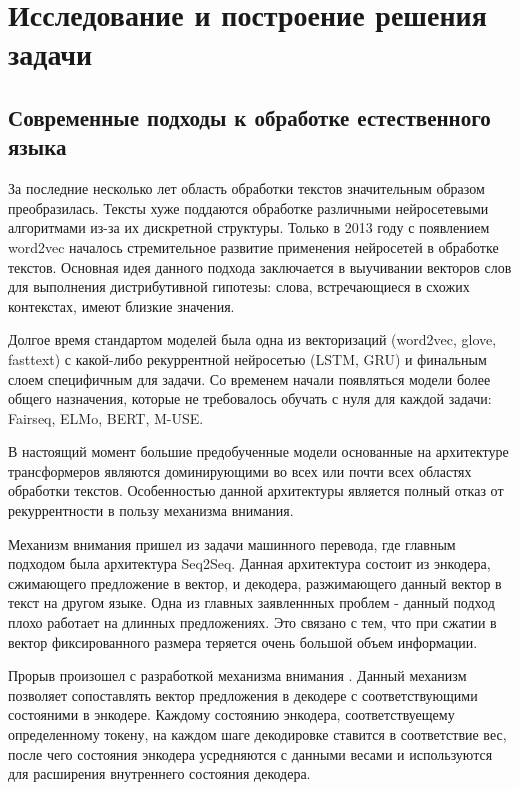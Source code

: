 \section{Исследование и построение решения задачи}
\subsection{Современные подходы к обработке естественного языка}
За последние несколько лет область обработки текстов значительным образом преобразилась. Тексты хуже поддаются обработке различными нейросетевыми алгоритмами из-за их дискретной структуры. Только в 2013 году с появлением word2vec началось стремительное развитие применения нейросетей в обработке текстов. Основная идея данного подхода заключается в выучивании векторов слов для выполнения дистрибутивной гипотезы: слова, встречающиеся в схожих контекстах, имеют близкие значения.

Долгое время стандартом моделей была одна из векторизаций (word2vec, glove, fasttext) с какой-либо рекуррентной нейросетью (LSTM, GRU) и финальным слоем специфичным для задачи. Со временем начали появляться модели более общего назначения, которые не требовалось обучать с нуля для каждой задачи: Fairseq, ELMo\cite{Peters:2018}, BERT\cite{devlin2018bert}, M-USE.

В настоящий момент большие предобученные модели основанные на архитектуре трансформеров являются доминирующими во всех или почти всех областях обработки текстов. Особенностью данной архитектуры является полный отказ от рекуррентности в пользу механизма внимания.

Механизм внимания пришел из задачи машинного перевода, где главным подходом была архитектура Seq2Seq. Данная архитектура состоит из энкодера, сжимающего предложение в вектор, и декодера, разжимающего данный вектор в текст на другом языке. Одна из главных заявленнных проблем - данный подход плохо работает на длинных предложениях. Это связано с тем, что при сжатии в вектор фиксированного размера теряется очень большой объем информации.

Прорыв произошел с разработкой механизма внимания \cite{bahdanau2014neural}. Данный механизм позволяет сопоставлять вектор предложения в декодере с соответствующими состояними в энкодере. Каждому состоянию энкодера, соответствуещему определенному токену, на каждом шаге декодировке ставится в соответствие вес, после чего состояния энкодера усредняются с данными весами и используются для расширения внутреннего состояния декодера.

